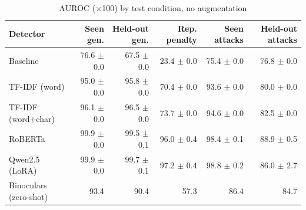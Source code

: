 \begin{table}[!t]
\centering
\caption{AUROC (×100) by test condition, no augmentation}
\label{tab:main_auroc}
\footnotesize
\begin{tabular}{lrrrrr}
\toprule
\textbf{Detector} & \textbf{Seen gen.} & \textbf{Held-out gen.} & \textbf{Rep. penalty} & \textbf{Seen attacks} & \textbf{Held-out attacks} \\
\midrule
Baseline & 76.6 $\pm$ 0.0 & 67.5 $\pm$ 0.0 & 23.4 $\pm$ 0.0 & 75.4 $\pm$ 0.0 & 76.8 $\pm$ 0.0 \\
TF-IDF (word) & 95.0 $\pm$ 0.0 & 95.8 $\pm$ 0.0 & 70.4 $\pm$ 0.0 & 93.6 $\pm$ 0.0 & 80.0 $\pm$ 0.0 \\
TF-IDF (word+char) & 96.1 $\pm$ 0.0 & 96.5 $\pm$ 0.0 & 73.7 $\pm$ 0.0 & 94.6 $\pm$ 0.0 & 82.5 $\pm$ 0.0 \\
RoBERTa & 99.9 $\pm$ 0.0 & 99.5 $\pm$ 0.1 & 96.0 $\pm$ 0.4 & 98.4 $\pm$ 0.1 & 88.9 $\pm$ 0.5 \\
Qwen2.5 (LoRA) & 99.9 $\pm$ 0.0 & 99.7 $\pm$ 0.1 & 97.2 $\pm$ 0.4 & 98.8 $\pm$ 0.2 & 86.0 $\pm$ 2.7 \\
Binoculars (zero-shot) & 93.4 & 90.4 & 57.3 & 86.4 & 84.7 \\
\bottomrule
\end{tabular}
\end{table}
